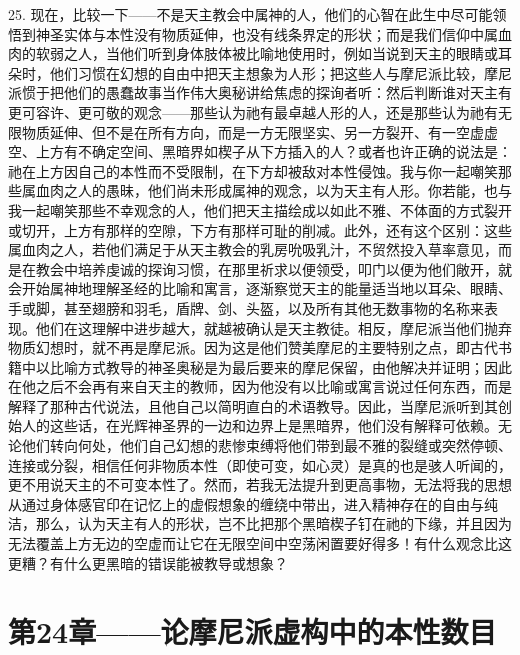 25. 现在，比较一下——不是天主教会中属神的人，他们的心智在此生中尽可能领悟到神圣实体与本性没有物质延伸，也没有线条界定的形状；而是我们信仰中属血肉的软弱之人，当他们听到身体肢体被比喻地使用时，例如当说到天主的眼睛或耳朵时，他们习惯在幻想的自由中把天主想象为人形；把这些人与摩尼派比较，摩尼派惯于把他们的愚蠢故事当作伟大奥秘讲给焦虑的探询者听：然后判断谁对天主有更可容许、更可敬的观念——那些认为祂有最卓越人形的人，还是那些认为祂有无限物质延伸、但不是在所有方向，而是一方无限坚实、另一方裂开、有一空虚虚空、上方有不确定空间、黑暗界如楔子从下方插入的人？或者也许正确的说法是：祂在上方因自己的本性而不受限制，在下方却被敌对本性侵蚀。我与你一起嘲笑那些属血肉之人的愚昧，他们尚未形成属神的观念，以为天主有人形。你若能，也与我一起嘲笑那些不幸观念的人，他们把天主描绘成以如此不雅、不体面的方式裂开或切开，上方有那样的空隙，下方有那样可耻的削减。此外，还有这个区别：这些属血肉之人，若他们满足于从天主教会的乳房吮吸乳汁，不贸然投入草率意见，而是在教会中培养虔诚的探询习惯，在那里祈求以便领受，叩门以便为他们敞开，就会开始属神地理解圣经的比喻和寓言，逐渐察觉天主的能量适当地以耳朵、眼睛、手或脚，甚至翅膀和羽毛，盾牌、剑、头盔，以及所有其他无数事物的名称来表现。他们在这理解中进步越大，就越被确认是天主教徒。相反，摩尼派当他们抛弃物质幻想时，就不再是摩尼派。因为这是他们赞美摩尼的主要特别之点，即古代书籍中以比喻方式教导的神圣奥秘是为最后要来的摩尼保留，由他解决并证明；因此在他之后不会再有来自天主的教师，因为他没有以比喻或寓言说过任何东西，而是解释了那种古代说法，且他自己以简明直白的术语教导。因此，当摩尼派听到其创始人的这些话，在光辉神圣界的一边和边界上是黑暗界，他们没有解释可依赖。无论他们转向何处，他们自己幻想的悲惨束缚将他们带到最不雅的裂缝或突然停顿、连接或分裂，相信任何非物质本性（即使可变，如心灵）是真的也是骇人听闻的，更不用说天主的不可变本性了。然而，若我无法提升到更高事物，无法将我的思想从通过身体感官印在记忆上的虚假想象的缠绕中带出，进入精神存在的自由与纯洁，那么，认为天主有人的形状，岂不比把那个黑暗楔子钉在祂的下缘，并且因为无法覆盖上方无边的空虚而让它在无限空间中空荡闲置要好得多！有什么观念比这更糟？有什么更黑暗的错误能被教导或想象？\par


\section{第24章——论摩尼派虚构中的本性数目}

